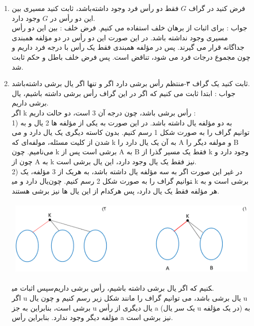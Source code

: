 \documentclass{ut}
\begin{document}
\begin{enumerate}
    \item
    فرض کنید در گراف $G$ فقط دو رأس فرد وجود داشته‌باشد، ثابت کنید مسیری بین این دو رأس در $G$ وجود دارد. \\
    {\color{Red} جواب :}
    برای اثبات از برهان خلف استفاده می کنیم. فرض خلف : بین این دو رأس مسیری وجود نداشته باشد. در این صورت این دو رأس در دو مؤلفه همبندی جداگانه قرار می گیرند. پس در مؤلفه همبندی فقط یک رأس با درجه فرد داریم و چون مجموع درجات فرد می شود، تناقض است. پس فرض خلف باطل و حکم ثابت شد.
    \item
    ثابت کنید یک گراف ۳-منتظم رأس برشی دارد اگر و تنها اگر یال برشی داشته‌باشد. \\
    {\color{Red} جواب :}
    ابتدا ثابت می کنیم که اگر در این گراف رأس برشی داشته باشیم، یال برشی داریم.\\
    اگر k رأس برشی باشد، چون درجه آن 3 است، دو حالت داریم : \\
    1)	به دو مؤلفه یال داشته باشد. در این صورت به یکی از مؤلفه ها 2 یال و به دیگری یک یال دارد و می‎ توانیم گراف را به صورت شکل 1 رسم کنیم. بدون کاسته شدن از کلیت مسئله، مولفه‌ای که k به آن یک یال دارد را A و مولفه دیگر را B می‌نامیم. چون k برشی است پس از A به B فقط یک مسیر گذرا از k وجود دارد و چون از A به k نیز فقط یک یال وجود دارد، این یال برشی است.\\
    2)	در غیر این صورت اگر به سه مؤلفه یال داشته باشد، به هریک از 3 مؤلفه، یک یال دارد و می‎توانیم گراف را به صورت شکل 2 رسم کنیم. چون k برشی است و به هر مؤلفه فقط یک یال دارد، پس هرکدام از این یال ها نیز برشی هستند. \\
    \\
    \includegraphics[width=15cm, height=3.5cm]{1.png}\\
    \\
    سپس اثبات می‎کنیم که اگر یال برشی داشته باشیم، رأس برشی داریم.\\
    اگر u یال برشی باشد، می توانیم گراف را مانند شکل زیر رسم کنیم و چون یال u برشی است، بنابراین به جز u یال دیگری از رأس a (یک سر یال u در یک مؤلفه) به مؤلفه دیگر وجود ندارد. بنابراین رأس a نیز برشی است.\\

\end{enumerate}
\end{document}
